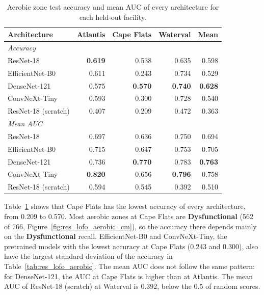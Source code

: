 \begin{table}[htbp]
\centering
\caption{Aerobic zone test accuracy and mean AUC of every architecture for each held-out facility.}
\label{tab:res_lofo_aerobic_facility}
\begin{tabular}{lrrrr}
\toprule
\textbf{Architecture} & \textbf{Atlantis} & \textbf{Cape Flats} & \textbf{Waterval} & \textbf{Mean} \\
\midrule
\multicolumn{5}{l}{\textit{Accuracy}} \\
ResNet-18 & \textbf{0.619} & 0.538 & 0.635 & 0.598 \\
EfficientNet-B0 & 0.611 & 0.243 & 0.734 & 0.529 \\
DenseNet-121 & 0.575 & \textbf{0.570} & \textbf{0.740} & \textbf{0.628} \\
ConvNeXt-Tiny & 0.593 & 0.300 & 0.728 & 0.540 \\
ResNet-18 (scratch) & 0.407 & 0.209 & 0.472 & 0.363 \\
\midrule
\multicolumn{5}{l}{\textit{Mean AUC}} \\
ResNet-18 & 0.697 & 0.636 & 0.750 & 0.694 \\
EfficientNet-B0 & 0.715 & 0.647 & 0.753 & 0.705 \\
DenseNet-121 & 0.736 & \textbf{0.770} & 0.783 & \textbf{0.763} \\
ConvNeXt-Tiny & \textbf{0.820} & 0.656 & \textbf{0.796} & 0.758 \\
ResNet-18 (scratch) & 0.594 & 0.545 & 0.392 & 0.510 \\
\bottomrule
\end{tabular}
\end{table}

Table~\ref{tab:res_lofo_aerobic_facility} shows that Cape Flats has the lowest accuracy of every architecture, from 0.209 to 0.570. Most aerobic zones at Cape Flats are \textbf{Dysfunctional} (562 of 766, Figure~\ref{fig:res_lofo_aerobic_cm}), so the accuracy there depends mainly on the \textbf{Dysfunctional} recall. EfficientNet-B0 and ConvNeXt-Tiny, the pretrained models with the lowest accuracy at Cape Flats (0.243 and 0.300), also have the largest standard deviation of the accuracy in Table~\ref{tab:res_lofo_aerobic}. The mean AUC does not follow the same pattern: for DenseNet-121, the AUC at Cape Flats is higher than at Atlantis. The mean AUC of ResNet-18 (scratch) at Waterval is 0.392, below the 0.5 of random scores.

